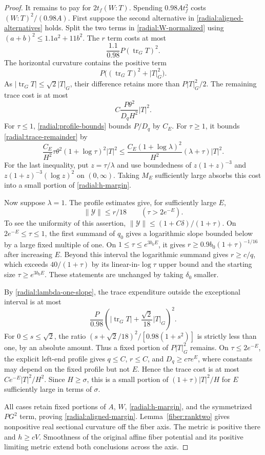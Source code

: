 \begin{proof}
It remains to pay for $2t_f(W:T)$. Spending $0.98A t_f^2$ costs $(W:T)^2/(0.98A)$. First suppose the second alternative in \eqref{radial:aligned-alternatives} holds. Split the two terms in \eqref{radial:W-normalized} using $(a+b)^2\le1.1a^2+11b^2$. The $r$ term costs at most
\[
 \frac{1.1}{0.98}P(\operatorname{tr}_G T)^2.
\]
The horizontal curvature contains the positive term
\[
 P\bigl((\operatorname{tr}_G T)^2+|T|_G^2\bigr).
\]
As $|\operatorname{tr}_G T|\le\sqrt2|T|_G$, their difference retains more than $P|T|_G^2/2$. The remaining trace cost is at most
\begin{equation}\label{radial:trace-remainder}
 C\frac{P\theta^2}{D_qH^2}|T|^2.
\end{equation}
For $\tau\le1$, \eqref{radial:profile-bounds} bounds $P/D_q$ by $C_E$. For $\tau\ge1$, it bounds \eqref{radial:trace-remainder} by
\[
 \frac{C_E}{H^2}\tau\theta^2(1+\log\tau)^2|T|^2
 \le \frac{C_E(1+\log\lambda)^2}{H^2}
             (\lambda+\tau)|T|^2.
\]
For the last inequality, put $z=\tau/\lambda$ and use boundedness of
$z(1+z)^{-3}$ and $z(1+z)^{-3}(\log z)^2$ on $(0,\infty)$. Taking $M_E$ sufficiently large absorbs this cost into a small portion of \eqref{radial:h-margin}.

Now suppose $\lambda=1$. The profile estimates give, for sufficiently large $E$,
\begin{equation}\label{radial:lambda-one-slope}
 \|\mathcal Y\|\le r/18\qquad(\tau>2e^{-E}).
\end{equation}
To see the uniformity of this assertion, $\|\mathcal Y\|\le(1+C\delta)/(1+\tau)$. On $2e^{-E}\le\tau\le1$, the first summand of $q_0$ gives a logarithmic slope bounded below by a large fixed multiple of one. On $1\le\tau\le e^{3b_0E}$, it gives $r\ge0.9b_0(1+\tau)^{-1/16}$ after increasing $E$. Beyond this interval the logarithmic summand gives $r\ge c/q$, which exceeds $40/(1+\tau)$ by its linear-in-$\log\tau$ upper bound and the starting size $\tau\ge e^{3b_0E}$. These statements are unchanged by taking $\delta_0$ smaller.

By \eqref{radial:lambda-one-slope}, the trace expenditure outside the exceptional interval is at most
\[
 \frac{P}{0.98}
       \left(|\operatorname{tr}_GT|+\frac{\sqrt2}{18}|T|_G\right)^2.
\]
For $0\le s\le\sqrt2$, the ratio $(s+\sqrt2/18)^2/[0.98(1+s^2)]$ is strictly less than one, by an absolute amount. Thus a fixed portion of $P|T|_G^2$ remains. On $\tau\le2e^{-E}$, the explicit left-end profile gives $q\le C$, $r\le C$, and $D_q\ge c\tau e^E$, where constants may depend on the fixed profile but not $E$. Hence the trace cost is at most $Ce^{-E}|T|^2/H^2$. Since $H\ge\sigma$, this is a small portion of $(1+\tau)|T|^2/H$ for $E$ sufficiently large in terms of $\sigma$.

All cases retain fixed portions of $A$, $W$, \eqref{radial:h-margin}, and the symmetrized $PG^2$ term, proving \eqref{radial:aligned-margin}. Lemma~\ref{fiber:ranktwo} gives nonpositive real sectional curvature off the fiber axis. The metric is positive there and $h\ge cV$. Smoothness of the original affine fiber potential and its positive limiting metric extend both conclusions across the axis.
\end{proof}
